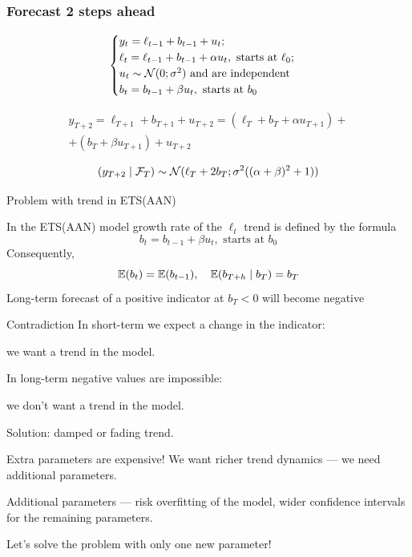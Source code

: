 \begin{frame}
	\frametitle{Forecast 2 steps ahead}
	
	\[
	\begin{cases}
		y_t = \ell_{t-1} + b_{t-1} + u_t; \\
		\ell_t = \ell_{t-1} + b_{t-1} + \alpha u_t, \text{ starts at } \ell_0; \\
		u_t \sim \mathcal{N}(0;\sigma^2) \text{ and are independent} \\
		b_t = b_{t-1} + \beta u_t,\text{ starts at } b_0 \\
	\end{cases}
	\]
	
	\begin{multline*}
		y_{T+2} = \ell_{T+1} + b_{T+1} + u_{T+2} = (\ell_T + b_T + \alpha u_{T+1}) +\\
		+ (b_T + \beta u_{T+1}) + u_{T+2}
	\end{multline*}
	
	\[
	(y_{T+2} \mid \mathcal F_T) \sim \mathcal{N}(\ell_T + 2b_T; \sigma^2((\alpha + \beta)^2 + 1))
	\]
	
\end{frame}



\begin{frame}{Problem with trend in ETS(AAN)}
	
	In the ETS(AAN) model \alert{growth rate} of the $\ell_t$ trend is defined by the formula
	\[
	b_t = b_{t-1} + \beta u_t, \text{ starts at } b_0
	\]
	\pause
	Consequently,
	\[
	\mathbb{E}(b_t) = \mathbb{E}(b_{t-1}), \quad \mathbb{E}(b_{T+h} \mid b_T) = b_T
	\]
	\pause
	Long-term forecast of a positive indicator at $b_T < 0$
	will become negative
\end{frame}

\begin{frame}{Contradiction}
	In short-term we expect a change in the indicator:
	
	we \alert{ want a trend} in the model.
	
	\pause
	In long-term negative values are impossible:
	
	we  \alert{don't want a trend} in the model.
	
	\pause
	Solution: \alert{damped} or \alert{fading} trend.
\end{frame}

\begin{frame}{Extra parameters are expensive!}
	We want richer trend dynamics — we need \alert{additional} parameters.
	
	\pause
	Additional parameters — risk \alert{overfitting} of the model,
	\alert{wider confidence intervals} for the remaining parameters.
	
	\pause
	Let's solve the problem  with only \alert{one} new parameter!
\end{frame}

